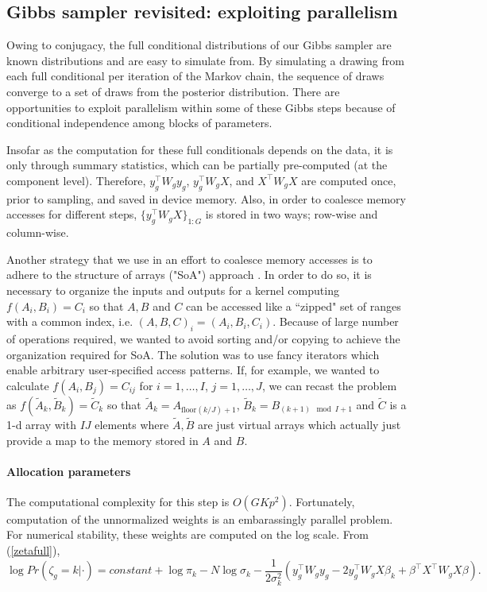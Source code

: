 {\subsection{Gibbs sampler revisited: exploiting parallelism}
\label{subsec:gibbs-revisited}
Owing to conjugacy, the full conditional distributions of our Gibbs sampler are known distributions and are easy to simulate from. By simulating a drawing from each full conditional per iteration of the Markov chain, the sequence of draws converge to a set of draws from the posterior distribution. There are opportunities to exploit parallelism within some of these Gibbs steps because of conditional independence among blocks of parameters. 

Insofar as the computation for these full conditionals depends on the data, it is only through summary statistics, which can be partially pre-computed (at the component level). Therefore, $y_g^\top W_g y_g$, $y_g^\top W_g X$, and $X^\top W_g X$ are computed once, prior to sampling, and saved in device memory. Also, in order to coalesce memory accesses for different steps, $\{y_g^\top W_g X\}_{1:G}$ is stored in two ways; row-wise and column-wise.

Another strategy that we use in an effort to coalesce memory accesses is to adhere to the structure of arrays ("SoA") approach \citep{thrustslides}. In order to do so, it is necessary to organize the inputs and outputs for a kernel computing $f(A_i,B_i)=C_i$ so that $A, B$ and $C$ can be accessed like a ``zipped" set of ranges with a common index, i.e. $(A,B,C)_i = (A_i,B_i,C_i)$. Because of large number of operations required, we wanted to avoid sorting and/or copying to achieve the organization required for SoA. The solution was to use fancy iterators which enable arbitrary user-specified access patterns. If, for example, we wanted to calculate $f(A_i,B_j)=C_{ij}$ for $i=1,\ldots,I$, $j=1,\ldots,J$, we can recast the problem as $f(\tilde{A}_k,\tilde{B}_k)=\tilde{C}_k$ so that $\tilde{A}_k=A_{\mbox{floor}(k/J)+1}$, $\tilde{B}_k=B_{(k+1) \mod I +1}$ and $\tilde{C}$ is a 1-d array with $IJ$ elements where $\tilde{A},\tilde{B}$ are just virtual arrays which actually just provide a map to the memory stored in $A$ and $B$. 

\paragraph{Allocation parameters}
The computational complexity for this step is $O(GKp^2)$. Fortunately, computation of the unnormalized weights is an embarassingly parallel problem. For numerical stability, these weights are computed on the log scale. From (\ref{zetafull}),
\begin{equation}
\label{logweight}
\log Pr(\zeta_g=k|\cdot) = constant + \log \pi_k -N \log \sigma_k - \frac{1}{2\sigma^2_k}\left(y_g^\top W_g y_g - 2y_g^\top W_g X \beta_k + \beta^\top X^\top W_g X \beta \right).
\end{equation}

}
